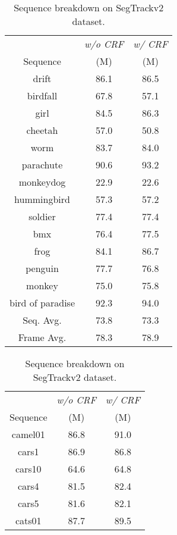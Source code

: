 \begin{table}[t]
\parbox{.48\linewidth}{
    
    \begin{center}
    \begin{tabular}{ccc}
        \toprule
         & \textit{w/o CRF}  & \textit{w/ CRF} \\
         Sequence & (M) & (M)  \\
         \midrule
drift            & 86.1 & 86.5 \\
birdfall         & 67.8 & 57.1 \\
girl             & 84.5 & 86.3 \\
cheetah          & 57.0 & 50.8 \\
worm             & 83.7 & 84.0 \\
parachute        & 90.6 & 93.2 \\
monkeydog        & 22.9 & 22.6 \\
hummingbird      & 57.3 & 57.2 \\
soldier          & 77.4 & 77.4 \\
bmx              & 76.4 & 77.5 \\
frog             & 84.1 & 86.7 \\
penguin          & 77.7 & 76.8 \\
monkey           & 75.0 & 75.8 \\
bird of paradise & 92.3 & 94.0 \\
\midrule
Seq. Avg.          & 73.8 & 73.3 \\
Frame Avg.         & 78.3 & 78.9 \\
            \bottomrule
    \end{tabular}
    \end{center}
    \caption{Sequence breakdown on SegTrackv2 dataset. }
    \label{tab:supp_seq_stv2}
}
\hfill
\parbox{.48\linewidth}{
    \begin{center}
    \begin{tabular}{ccc}
        \toprule
         & \textit{w/o CRF}  & \textit{w/ CRF} \\
         Sequence & (M) & (M)  \\
         \midrule
camel01 & 86.8 & 91.0 \\
cars1 & 86.9 & 86.8 \\
cars10 & 64.6 & 64.8 \\
cars4 & 81.5 & 82.4 \\
cars5 & 81.6 & 82.1 \\
cats01 & 87.7 & 89.5 \\

\end{tabular}
\end{center}}
\end{table}
